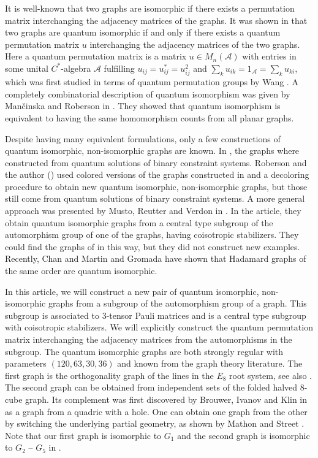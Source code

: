 \documentclass[11pt]{article}
\theoremstyle{definition}
\numberwithin{equation}{section}
\begin{document}
It is well-known that two graphs are isomorphic if there exists a permutation matrix interchanging the adjacency matrices of the graphs. It was shown in \cite{AMRSSV} that two graphs are quantum isomorphic if and only if there exists a quantum permutation matrix $u$ interchanging the adjacency matrices of the two graphs. Here a quantum permutation matrix is a matrix $u\in M_n(\mathcal{A})$ with entries in some unital $C^*$-algebra $\mathcal{A}$ fulfilling $u_{ij}=u_{ij}^*=u_{ij}^2$ and $\sum_k u_{ik}=1_{\mathcal{A}}=\sum_k u_{ki}$, which was first studied in terms of quantum permutation groups by Wang \cite{WanSn}.
A completely combinatorial description of quantum isomorphism was given by Man\v{c}inska and Roberson in \cite{MRplanar}. They showed that quantum isomorphism is equivalent to having the same homomorphism counts from all planar graphs. 

Despite having many equivalent formulations, only a few constructions of quantum isomorphic, non-isomorphic graphs are known. In \cite{AMRSSV}, the graphs where constructed from quantum solutions of binary constraint systems. Roberson and the author (\cite{RS}) used colored versions of the graphs constructed in \cite{AMRSSV} and a decoloring procedure to obtain new quantum isomorphic, non-isomorphic graphs, but those still come from quantum solutions of binary constraint systems. 
A more general approach was presented by Musto, Reutter and Verdon in \cite{MRV}. In the article, they obtain quantum isomorphic graphs from a central type subgroup of the automorphism group of one of the graphs, having coisotropic stabilizers. They could find the graphs of \cite{AMRSSV} in this way, but they did not construct new examples. Recently, Chan and Martin \cite{CM} and Gromada \cite{G} have shown that Hadamard graphs of the same order are quantum isomorphic. 

In this article, we will construct a new pair of quantum isomorphic, non-isomorphic graphs from a subgroup of the automorphism group of a graph. This subgroup is associated to $3$-tensor Pauli matrices and is a central type subgroup with coisotropic stabilizers. We will explicitly construct the quantum permutation matrix interchanging the adjacency matrices from the automorphisms in the subgroup. The quantum isomorphic graphs are both strongly regular with parameters $(120, 63, 30, 36)$ and known from the graph theory literature. The first graph is the orthogonality graph of the lines in the $E_8$ root system, see also \cite[Section 10.39]{BVM}. The second graph can be obtained from independent sets of the folded halved $8$-cube graph. Its complement was first discovered by Brouwer, Ivanov and Klin in \cite{BIK} as a graph from a quadric with a hole. 
One can obtain one graph from the other by switching the underlying partial geometry, as shown by Mathon and Street \cite{MS}. Note that our first graph is isomorphic to $G_1$ and the second graph is isomorphic to $G_2$ -- $G_5$ in \cite[Table 2.2]{MS}. 
\end{document}
